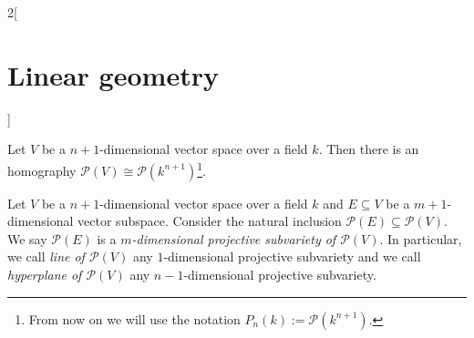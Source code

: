 \documentclass[../../../main.tex]{subfiles}
\begin{document}
\begin{multicols}{2}[\section{Linear geometry}]
\begin{definition}
\end{definition}
\begin{prop}
Let $V$ be a $n+1$-dimensional vector space over a field $k$. Then there is an homography $\mathcal{P}(V)\cong \mathcal{P}(k^{n+1})$\footnote{From now on we will use the notation $P_n(k):=\mathcal{P}(k^{n+1})$.}.
\end{prop}
\begin{definition}
Let $V$ be a $n+1$-dimensional vector space over a field $k$ and $E\subseteq V$ be a $m+1$-dimensional vector subspace. Consider the natural inclusion $\mathcal{P}(E)\subseteq\mathcal{P}(V)$. We say $\mathcal{P}(E)$ is a \textit{$m$-dimensional projective subvariety of $\mathcal{P}(V)$}. In particular, we call \textit{line of $\mathcal{P}(V)$} any $1$-dimensional projective subvariety and we call \textit{hyperplane of $\mathcal{P}(V)$} any $n-1$-dimensional projective subvariety.
\end{definition}

\end{multicols}
\end{document}
